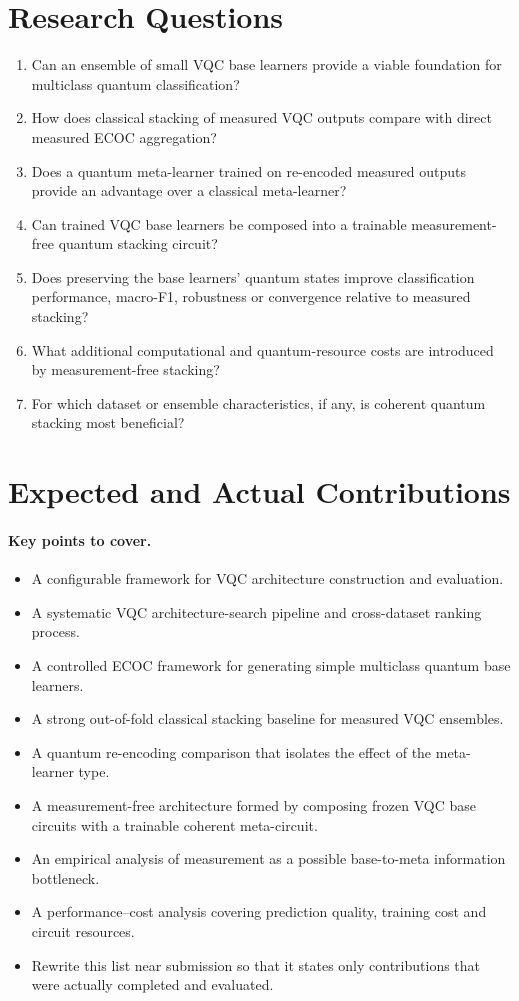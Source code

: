 \documentclass[]{UCD_CS_MSc_AAI_Report}
\newcommand{\sectionbrief}{\paragraph{Key points to cover.}}
\begin{document}
\section{Research Questions}
\label{sec:intro-rqs}

\begin{enumerate}
    \item Can an ensemble of small VQC base learners provide a viable foundation for multiclass quantum classification?
    \item How does classical stacking of measured VQC outputs compare with direct measured ECOC aggregation?
    \item Does a quantum meta-learner trained on re-encoded measured outputs provide an advantage over a classical meta-learner?
    \item Can trained VQC base learners be composed into a trainable measurement-free quantum stacking circuit?
    \item Does preserving the base learners' quantum states improve classification performance, macro-F1, robustness or convergence relative to measured stacking?
    \item What additional computational and quantum-resource costs are introduced by measurement-free stacking?
    \item For which dataset or ensemble characteristics, if any, is coherent quantum stacking most beneficial?
\end{enumerate}

\section{Expected and Actual Contributions}
\label{sec:intro-contributions}

\sectionbrief
\begin{itemize}
    \item A configurable framework for VQC architecture construction and evaluation.
    \item A systematic VQC architecture-search pipeline and cross-dataset ranking process.
    \item A controlled ECOC framework for generating simple multiclass quantum base learners.
    \item A strong out-of-fold classical stacking baseline for measured VQC ensembles.
    \item A quantum re-encoding comparison that isolates the effect of the meta-learner type.
    \item A measurement-free architecture formed by composing frozen VQC base circuits with a trainable coherent meta-circuit.
    \item An empirical analysis of measurement as a possible base-to-meta information bottleneck.
    \item A performance--cost analysis covering prediction quality, training cost and circuit resources.
    \item Rewrite this list near submission so that it states only contributions that were actually completed and evaluated.
\end{itemize}
\end{document}
